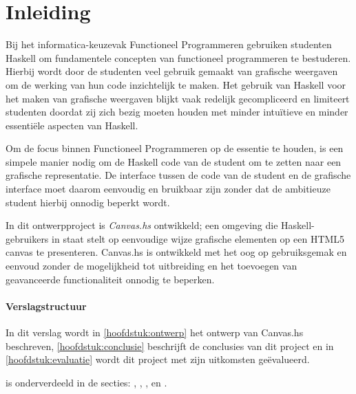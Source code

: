 \chapter{Inleiding}
Bij het informatica-keuzevak Functioneel Programmeren gebruiken studenten Haskell om fundamentele concepten van functioneel programmeren te bestuderen. Hierbij wordt door de studenten veel gebruik gemaakt van grafische weergaven om de werking van hun code inzichtelijk te maken. Het gebruik van Haskell voor het maken van grafische weergaven blijkt vaak redelijk gecompliceerd en  limiteert studenten doordat zij zich bezig moeten houden met minder intuïtieve en minder essentiële aspecten van Haskell. 

Om de focus binnen Functioneel Programmeren op de essentie te houden, is een simpele manier nodig om de Haskell code van de student om te zetten naar een grafische representatie. De interface tussen de code van de student en de grafische interface moet daarom eenvoudig en bruikbaar zijn zonder dat de ambitieuze student hierbij onnodig beperkt wordt.

In dit ontwerpproject is \emph{Canvas.hs} ontwikkeld; een omgeving die Haskell-gebruikers in staat stelt op eenvoudige wijze grafische elementen op een HTML5 canvas te presenteren. Canvas.hs is ontwikkeld met het oog op gebruiksgemak en eenvoud zonder de mogelijkheid tot uitbreiding en het toevoegen van geavanceerde functionaliteit onnodig te beperken.

\subsubsection{Verslagstructuur}
In dit verslag wordt in \autoref{hoofdstuk:ontwerp} het ontwerp van Canvas.hs beschreven, \autoref{hoofdstuk:conclusie} beschrijft de conclusies van dit project en in \autoref{hoofdstuk:evaluatie} wordt dit project met zijn uitkomsten geëvalueerd.

 is onderverdeeld in de secties: , , ,  en .